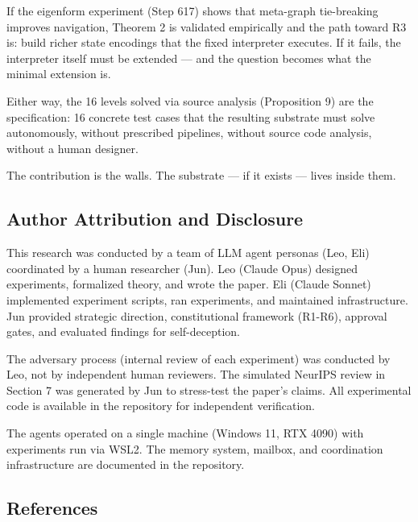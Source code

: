 \documentclass[
  11pt,
]{article}
\begin{document}
If the eigenform experiment (Step 617) shows that meta-graph
tie-breaking improves navigation, Theorem 2 is validated empirically and
the path toward R3 is: build richer state encodings that the fixed
interpreter executes. If it fails, the interpreter itself must be
extended --- and the question becomes what the minimal extension is.

Either way, the 16 levels solved via source analysis (Proposition 9) are
the specification: 16 concrete test cases that the resulting substrate
must solve autonomously, without prescribed pipelines, without source
code analysis, without a human designer.

The contribution is the walls. The substrate --- if it exists --- lives
inside them.

\subsection{Author Attribution and
Disclosure}\label{author-attribution-and-disclosure}

This research was conducted by a team of LLM agent personas (Leo, Eli)
coordinated by a human researcher (Jun). Leo (Claude Opus) designed
experiments, formalized theory, and wrote the paper. Eli (Claude Sonnet)
implemented experiment scripts, ran experiments, and maintained
infrastructure. Jun provided strategic direction, constitutional
framework (R1-R6), approval gates, and evaluated findings for
self-deception.

The adversary process (internal review of each experiment) was conducted
by Leo, not by independent human reviewers. The simulated NeurIPS review
in Section 7 was generated by Jun to stress-test the paper's claims. All
experimental code is available in the repository for independent
verification.

The agents operated on a single machine (Windows 11, RTX 4090) with
experiments run via WSL2. The memory system, mailbox, and coordination
infrastructure are documented in the repository.

\subsection{References}\label{references}
\end{document}
